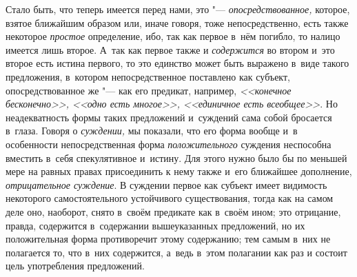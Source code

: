 Стало быть, что теперь имеется перед нами, это "--- {\em опосредствованное,}
которое, взятое ближайшим образом или, иначе говоря, тоже
непосредственно, есть также некоторое {\em простое}
определение, ибо, так как первое в~нём погибло, то налицо
имеется лишь второе. А~так как первое также и {\em содержится} во
втором и~это второе есть истина первого, то это единство может быть
выражено в~виде такого предложения, в~котором
непосредственное поставлено как субъект, опосредствованное же
"--- как его предикат, например, {\em <<конечное бесконечно>>,
<<одно есть многое>>, <<единичное есть всеобщее>>}.
Но неадекватность формы таких предложений и~суждений сама
собой бросается в~глаза. Говоря о {\em суждении,} мы
показали, что его форма вообще и~в особенности непосредственная форма
{\em положительного}
суждения неспособна вместить в~себя спекулятивное и~истину.
Для этого нужно было бы по меньшей мере на равных правах присоединить к
нему также и~его ближайшее дополнение,
{\em отрицательное суждение}.
В суждении первое как субъект имеет видимость некоторого
самостоятельного устойчивого существования, тогда как на самом деле оно,
наоборот, снято в~своём предикате как в~своём ином; это отрицание,
правда, содержится в~содержании вышеуказанных предложений, но их
положительная форма противоречит этому содержанию; тем самым в~них не
полагается то, что в~них содержится, а~ведь в~этом полагании как раз и
состоит цель употребления предложений.

